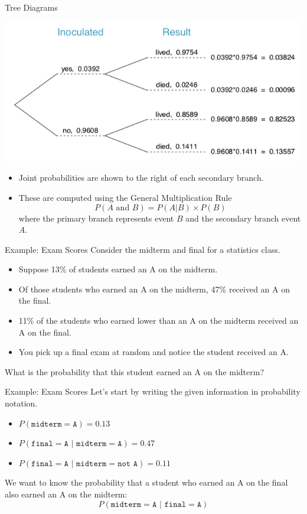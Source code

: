 \begin{frame}{Tree Diagrams}
    \begin{center}
        \includegraphics[scale=0.3]{images/tree.png}
    \end{center}
    \begin{itemize}
        \item Joint probabilities are shown to the right of each secondary branch.
        \item These are computed using the General Multiplication Rule
        \[
        P(A\text{ and }B)=P(A|B)\times P(B)
        \]
        where the primary branch represents event $B$ and the secondary branch event $A$.
    \end{itemize}
\end{frame}

\begin{frame}{Example: Exam Scores}
    Consider the midterm and final for a statistics class. 
    \begin{itemize}
        \item Suppose 13\% of students earned an A on the midterm. 
        \item Of those students who earned an A on the midterm, 47\% received an A on the final.
        \item 11\% of the students who earned lower than an A on the midterm received an A on the final.
        \item You pick up a final exam at random and notice the student received an A.
    \end{itemize} 
    What is the probability that this student earned an A on the midterm?
\end{frame}

\begin{frame}{Example: Exam Scores}
    Let's start by writing the given information in probability notation.
    \begin{itemize}
        \item $P(\texttt{midterm}=\texttt{A})=0.13$
        \item $P(\texttt{final}=\texttt{A } | \texttt{ midterm}=\texttt{A})=0.47$
        \item $P(\texttt{final}=\texttt{A } | \texttt{ midterm}=\texttt{not A})=0.11$
    \end{itemize}
    \vspace{12pt}We want to know the probability that a student who earned an A on the final also earned an A on the midterm:
    \[
    P(\texttt{midterm}=\texttt{A }|\texttt{ final}=\texttt{A})
    \]
\end{frame}

